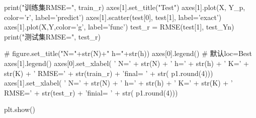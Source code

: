 \begin{python}
print("训练集RMSE=", train_r)
axes[1].set_title("Test")
axes[1].plot(X, Y_p, color='r', label='predict')
axes[1].scatter(test[0], test[1], label='exact')
axes[1].plot(X,Y,color='g', label='func')
test_r = RMSE(test[1], test_Yn)
print("测试集RMSE=", test_r)

# figure.set_title("N="+str(N)+" h="+str(h))
axes[0].legend()  # 默认loc=Best
axes[1].legend()
axes[0].set_xlabel(
    ' N=' + str(N) + ' h=' + str(h) + ' K=' + str(K) + ' RMSE=' + str(train_r) + '\nparameter final= ' + str(
        p1.round(4)))
axes[1].set_xlabel(
    ' N=' + str(N) + ' h=' + str(h) + ' K=' + str(K) + ' RMSE=' + str(test_r) + '\nparameter finial= ' + str(
        p1.round(4)))

plt.show()

\end{python}

